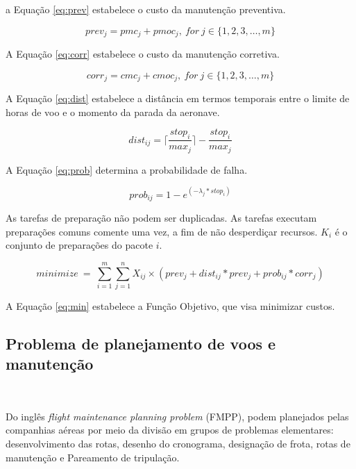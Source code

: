 \documentclass{amsart}
\begin{document}
a Equação \ref{eq:prev} estabelece o custo da manutenção preventiva.

\begin{equation}\label{eq:prev}
prev_j =  pmc_j + pmoc_j,\ for\ j \in \{1, 2, 3, \ldots, m\}
\end{equation}


A Equação \ref{eq:corr} estabelece o custo da manutenção corretiva.

\begin{equation}\label{eq:corr}
corr_j =  cmc_j + cmoc_j,\ for\ j \in \{1, 2, 3, \ldots, m\}
\end{equation}


A Equação  \ref{eq:dist} estabelece a distância em termos temporais entre o limite de horas de voo e o momento da parada da aeronave.

\begin{equation}\label{eq:dist}
dist_{ij} = \lceil{\frac{stop_i}{max_j}}\rceil{}-\frac{stop_i}{max_j} 
\end{equation}


A Equação  \ref{eq:prob} determina a probabilidade de falha.

\begin{equation}\label{eq:prob}
prob_{ij} = 1 - e^{(-\lambda{}_j * stop_i)}
\end{equation}

As tarefas de preparação não podem ser duplicadas. As tarefas executam preparações comuns comente uma vez, a fim de não desperdiçar recursos.
$K_i$ é o conjunto de preparações do pacote $i$.

\begin{equation} \label{eq:min}
minimize\ =\ \sum_{i=1}^{m} \sum_{j=1}^{n} X_{ij} \times ( prev_j + dist_{ij}*prev_j + prob_{ij}*corr_j )
\end{equation}

A Equação \ref{eq:min} estabelece a Função Objetivo, que visa minimizar custos.


\subsection{Problema de planejamento de voos e manutenção}\

Do inglês {\it flight maintenance planning problem} (FMPP), podem planejados pelas companhias aéreas por meio da divisão em grupos de problemas elementares: desenvolvimento das rotas, desenho do cronograma, designação de frota, rotas de manutenção e Pareamento de tripulação. 
\end{document}
